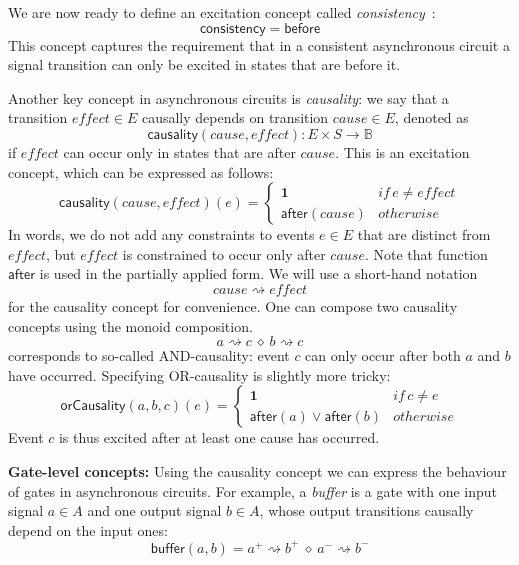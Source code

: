 \documentclass[british,compsoc]{IEEEtran}
\begin{document}
We are now ready to define an excitation concept called \emph{consistency}~\cite{Cortadella}:
\[
\mathsf{consistency}=\mathsf{before}
\]
This concept captures the requirement that in a consistent asynchronous
circuit a signal transition can only be excited in states that are
before it.

Another key concept in asynchronous circuits is \emph{causality}:
we say that a transition $\mathit{effect}\in E$ causally depends
on transition $\mathit{cause}\in E$, denoted as
\[
\mathsf{causality}(\mathit{cause},\mathit{effect}):E\times S\rightarrow\mathbb{B}
\]
 if $\mathit{effect}$ can occur only in states that are after $\mathit{cause}$.
This is an excitation concept, which can be expressed as follows:
\[
\mathsf{causality}(\mathit{cause},\mathit{effect})(e)\!=\!\begin{cases}
\mathbf{1} & \mathit{if}\, e\neq\mathit{effect}\\
\mathsf{after}(cause) & \mathit{otherwise}
\end{cases}
\]
In words, we do not add any constraints to events $e\in E$ that are
distinct from $\mathit{effect}$, but $\mathit{effect}$ is constrained
to occur only after $\mathit{cause}$. Note that function $\mathsf{after}$
is used in the partially applied form. We will use a short-hand notation
\[
\mathit{cause}\rightsquigarrow\mathit{effect}
\]
for the causality concept for convenience.
One can compose two causality concepts using the monoid composition.
\[
a\rightsquigarrow c\ \diamond\ b\rightsquigarrow c
\]
corresponds to so-called AND-causality: event $c$ can only occur
after both $a$ and $b$ have occurred. Specifying OR-causality is
slightly more tricky:
\[
\mathsf{orCausality}(a,b,c)(e)=\begin{cases}
\mathbf{1} & \mathit{if}\, c\neq\mathit{e}\\
\mathsf{after}(a)\vee\mathsf{after}(b) & \mathit{otherwise}
\end{cases}
\]
Event $c$ is thus excited after at least one cause has occurred.

\textbf{Gate-level concepts:} Using the causality concept we can express
the behaviour of gates in asynchronous circuits. For example, a \emph{buffer}
is a gate with one input signal $a\in A$ and one output signal $b\in A$,
whose output transitions causally depend on the input ones:
\[
\mathsf{buffer}(a, b)=a^{+}\rightsquigarrow b^{+}\ \diamond\ a^{-}\rightsquigarrow b^{-}
\]
\end{document}
